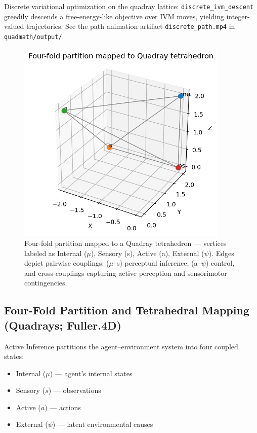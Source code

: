 \documentclass[
  10pt,
]{article}
\providecommand{\tightlist}{%
  \setlength{\itemsep}{0pt}\setlength{\parskip}{0pt}}
\begin{document}
Discrete variational optimization on the quadray lattice:
\texttt{discrete\_ivm\_descent} greedily descends a free-energy-like
objective over IVM moves, yielding integer-valued trajectories. See the
path animation artifact \texttt{discrete\_path.mp4} in
\texttt{quadmath/output/}.

\begin{figure}[htbp]
\centering
\includegraphics[width=0.9\textwidth]{figures/partition_tetrahedron.png}
\caption{Four-fold partition mapped to a Quadray tetrahedron — vertices labeled as Internal ($\mu$), Sensory (s), Active (a), External ($\psi$). Edges depict pairwise couplings: ($\mu$–s) perceptual inference, (a–$\psi$) control, and cross-couplings capturing active perception and sensorimotor contingencies.}
\label{fig:partition_tetrahedron}
\end{figure}

\hypertarget{four-fold-partition-and-tetrahedral-mapping-quadrays-fuller.4d}{%
\subsection{Four-Fold Partition and Tetrahedral Mapping (Quadrays;
Fuller.4D)}\label{four-fold-partition-and-tetrahedral-mapping-quadrays-fuller.4d}}

Active Inference partitions the agent--environment system into four
coupled states:

\begin{itemize}
\tightlist
\item
  Internal (\(\mu\)) --- agent's internal states
\item
  Sensory (\(s\)) --- observations
\item
  Active (\(a\)) --- actions
\item
  External (\(\psi\)) --- latent environmental causes
\end{itemize}
\end{document}
